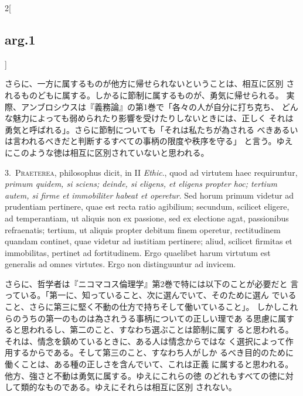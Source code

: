 \documentclass[paper=a4paper,fontsize=10pt,jafontsize=9pt,titlepage]{jlreq}
\begin{document}
\begin{paracol}{2}[\subsection{arg.1}]
\switchcolumn

さらに、一方に属するものが他方に帰せられないということは、相互に区別
 されるものどもに属する。しかるに節制に属するものが、勇気に帰せられる。
 実際、アンブロシウスは『義務論』の第1巻で「各々の人が自分に打ち克ち、
 どんな魅力によっても弱められたり影響を受けたりしないときには、正しく
 それは勇気と呼ばれる」。さらに節制についても「それは私たちが為される
 べきあるいは言われるべきだと判断するすべての事柄の限度や秩序を守る」
 と言う。ゆえにこのような徳は相互に区別されていないと思われる。


3.~{\scshape Praeterea}, philosophus dicit, in II {\itshape Ethic}.,
quod ad virtutem haec requiruntur, {\itshape primum quidem, si sciens;
deinde, si eligens, et eligens propter hoc; tertium autem, si firme et
immobiliter habeat et operetur}. Sed horum primum videtur ad
prudentiam pertinere, quae est recta ratio agibilium; secundum,
scilicet eligere, ad temperantiam, ut aliquis non ex passione, sed ex
electione agat, passionibus refraenatis; tertium, ut aliquis propter
debitum finem operetur, rectitudinem quandam continet, quae videtur ad
iustitiam pertinere; aliud, scilicet firmitas et immobilitas, pertinet
ad fortitudinem. Ergo quaelibet harum virtutum est generalis ad omnes
virtutes. Ergo non distinguuntur ad invicem.

\switchcolumn

さらに、哲学者は『ニコマコス倫理学』第2巻で特には以下のことが必要だと
 言っている。「第一に、知っていること、次に選んでいて、そのために選ん
 でいること、さらに第三に堅く不動の仕方で持ちそして働いていること」。
 しかしこれらのうちの第一のものは為されうる事柄についての正しい理であ
 る思慮に属すると思われるし、第二のこと、すなわち選ぶことは節制に属す
 ると思われる。それは、情念を鎮めているときに、ある人は情念からではな
 く選択によって作用するからである。そして第三のこと、すなわち人がしか
 るべき目的のために働くことは、ある種の正しさを含んでいて、これは正義
 に属すると思われる。他方、強さと不動は勇気に属する。ゆえにこれらの徳
 のどれもすべての徳に対して類的なものである。ゆえにそれらは相互に区別
 されない。

\switchcolumn*[\subsection{s.c.}]


\end{paracol}
\end{document}

